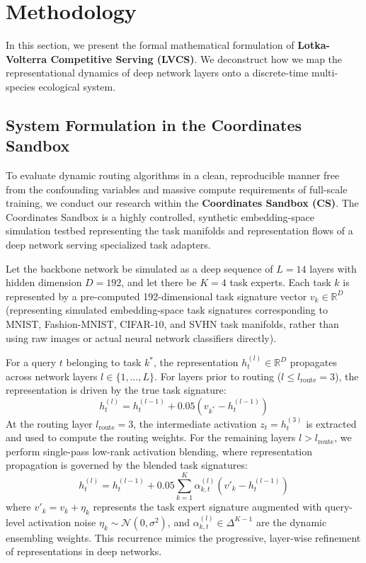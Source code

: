 \section{Methodology}
\label{sec:method}

In this section, we present the formal mathematical formulation of \textbf{Lotka-Volterra Competitive Serving (LVCS)}. We deconstruct how we map the representational dynamics of deep network layers onto a discrete-time multi-species ecological system.

\subsection{System Formulation in the Coordinates Sandbox}
To evaluate dynamic routing algorithms in a clean, reproducible manner free from the confounding variables and massive compute requirements of full-scale training, we conduct our research within the \textbf{Coordinates Sandbox (CS)}. The Coordinates Sandbox is a highly controlled, synthetic embedding-space simulation testbed representing the task manifolds and representation flows of a deep network serving specialized task adapters.

Let the backbone network be simulated as a deep sequence of $L = 14$ layers with hidden dimension $D = 192$, and let there be $K = 4$ task experts. Each task $k$ is represented by a pre-computed 192-dimensional task signature vector $v_k \in \mathbb{R}^D$ (representing simulated embedding-space task signatures corresponding to MNIST, Fashion-MNIST, CIFAR-10, and SVHN task manifolds, rather than using raw images or actual neural network classifiers directly).

For a query $t$ belonging to task $k^*$, the representation $h_t^{(l)} \in \mathbb{R}^D$ propagates across network layers $l \in \{1, \dots, L\}$. For layers prior to routing ($l \le l_{\text{route}} = 3$), the representation is driven by the true task signature:
\begin{equation}
    h_t^{(l)} = h_t^{(l-1)} + 0.05 (v_{k^*} - h_t^{(l-1)})
\end{equation}
At the routing layer $l_{\text{route}} = 3$, the intermediate activation $z_t = h_t^{(3)}$ is extracted and used to compute the routing weights. For the remaining layers $l > l_{\text{route}}$, we perform single-pass low-rank activation blending, where representation propagation is governed by the blended task signatures:
\begin{equation}
    \label{eq:rep_flow}
    h_t^{(l)} = h_t^{(l-1)} + 0.05 \sum_{k=1}^K \alpha_{k, t}^{(l)} (v'_k - h_t^{(l-1)})
\end{equation}
where $v'_k = v_k + \eta_k$ represents the task expert signature augmented with query-level activation noise $\eta_k \sim \mathcal{N}(0, \sigma^2)$, and $\alpha_{k, t}^{(l)} \in \Delta^{K-1}$ are the dynamic ensembling weights. This recurrence mimics the progressive, layer-wise refinement of representations in deep networks.

